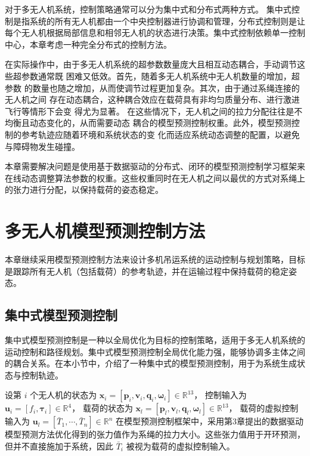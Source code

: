 \documentclass[lang=chs, degree=master, blindreview=true, winfonts=true]{yanputhesis}
\begin{document}
对于多无人机系统，控制策略通常可以分为集中式和分布式两种方式。
集中式控制是指系统的所有无人机都由一个中央控制器进行协调和管理，分布式控制则是让每个无人机根据局部信息和相邻无人机的状态进行决策。集中式控制依赖单一控制中心，本章考虑一种完全分布式的控制方法。

在实际操作中，由于多无人机系统的超参数数量庞大且相互动态耦合，手动调节这些超参数通常既
困难又低效。首先，随着多无人机系统中无人机数量的增加，超参数
的数量也随之增加，从而使调节过程更加复杂。其次，由于通过系绳连接的无人机之间
存在动态耦合，这种耦合效应在载荷具有非均匀质量分布、进行激进飞行等情形下会变
得尤为显著。
在这些情况下，无人机之间的拉力分配往往是不均衡且动态变化的，从而需要动态
耦合的模型预测控制权重。此外，模型预测控制的参考轨迹应随着环境和系统状态的变
化而适应系统动态调整的配置，以避免与障碍物发生碰撞。

本章需要解决问题是使用基于数据驱动的分布式、闭环的模型预测控制学习框架来在线动态调整算法参数的权重。这些权重同时在无人机之间以最优的方式对系绳上的张力进行分配，以保持载荷的姿态稳定。


\section{多无人机模型预测控制方法}
本章继续采用模型预测控制方法来设计多机吊运系统的运动控制与规划策略，目标是跟踪所有无人机（包括载荷）的参考轨迹，并在运输过程中保持载荷的稳定姿态。
\subsection{集中式模型预测控制}
集中式模型预测控制是一种以全局优化为目标的控制策略，适用于多无人机系统的运动控制和路径规划。集中式模型预测控制全局优化能力强，能够协调多主体之间的耦合关系。在本小节中，介绍了一种集中式的模型预测控制，用于为系统生成状态与控制轨迹。

设第 \( i \) 个无人机的状态为 
\(
\bm{x}_i = \left[ \bm{p}_i, \bm{v}_i, \bm{q}_i, \bm{\omega}_i \right] \in \mathbb{R}^{13}
\)，
控制输入为 
\(
\bm{u}_i = \left[ f_i, \bm{\tau}_i \right] \in \mathbb{R}^4
\)，
载荷的状态为 
\(
\bm{x}_l = \left[ \bm{p}_l, \bm{v}_l, \bm{q}_l, \bm{\omega}_l \right] \in \mathbb{R}^{13}
\)，
载荷的虚拟控制输入为 
\(
\bm{u}_l = \left[ \bar{T}_1, \cdots, \bar{T}_n \right] \in \mathbb{R}^n
\)
在模型预测控制框架中，采用第3章提出的数据驱动模型预测方法优化得到的张力值作为系绳的拉力大小。这些张力值用于开环预测，但并不直接施加于系统，因此 \( \bar{T}_i \) 被视为载荷的虚拟控制输入。
\end{document}
